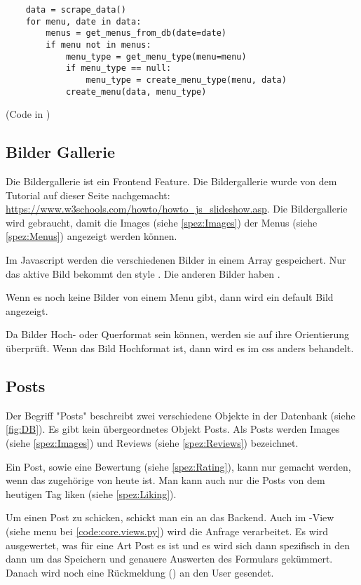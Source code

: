 \begin{lstlisting}
    data = scrape_data()
    for menu, date in data:
        menus = get_menus_from_db(date=date)
        if menu not in menus:
            menu_type = get_menu_type(menu=menu)
            if menu_type == null:
                menu_type = create_menu_type(menu, data)
            create_menu(data, menu_type)
\end{lstlisting}

(Code in )

\subsection{Bilder Gallerie} \label{spez:Gallerie}

Die Bildergallerie ist ein Frontend Feature. Die Bildergallerie wurde von dem
Tutorial auf dieser Seite nachgemacht:
\url{https://www.w3schools.com/howto/howto_js_slideshow.asp}. Die Bildergallerie
wird gebraucht, damit die Images (siehe \ref{spez:Images}) der Menus (siehe
\ref{spez:Menus}) angezeigt werden können.

Im Javascript werden die verschiedenen Bilder in einem Array gespeichert. Nur
das aktive Bild bekommt den style . Die anderen Bilder
haben .

Wenn es noch keine Bilder von einem Menu gibt, dann wird ein default Bild
angezeigt.

Da Bilder Hoch- oder Querformat sein können, werden sie auf ihre Orientierung
überprüft. Wenn das Bild Hochformat ist, dann wird es im css anders
behandelt.

\subsection{Posts} \label{spez:Posts}

Der Begriff "Posts" beschreibt zwei verschiedene Objekte in der Datenbank (siehe
\ref{fig:DB}). Es gibt kein übergeordnetes Objekt Posts. Als Posts werden Images
(siehe \ref{spez:Images}) und Reviews (siehe \ref{spez:Reviews}) bezeichnet.

Ein Post, sowie eine Bewertung (siehe \ref{spez:Rating}), kann nur gemacht
werden, wenn das zugehörige  von heute ist. Man kann auch nur die
Posts von dem heutigen Tag liken (siehe \ref{spez:Liking}).

Um einen Post zu schicken, schickt man ein  an das Backend.
Auch im -View (siehe menu bei {\ref{code:core.views.py}}) wird die
Anfrage verarbeitet. Es wird ausgewertet, was für eine Art Post es ist und es
wird sich dann spezifisch in den  dann um das Speichern
und genauere Auswerten des Formulars gekümmert. Danach wird noch eine
Rückmeldung () an den User gesendet.

